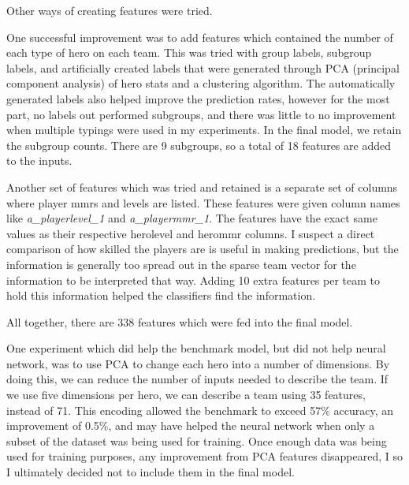 \documentclass[twoside,twocolumn]{article}
\begin{document}
Other ways of creating features were tried.

One successful improvement was to add features which contained the number of each type of hero on each team.  This was tried with group labels, subgroup labels, and artificially created labels that were generated through PCA (principal component analysis) of hero stats and a clustering algorithm.  The automatically generated labels also helped improve the prediction rates, however for the most part, no labels out performed subgroups, and there was little to no improvement when multiple typings were used in my experiments.  In the final model, we retain the subgroup counts.  There are 9 subgroups, so a total of 18 features are added to the inputs.

Another set of features which was tried and retained is a separate set of columns where player mmrs and levels are listed.  These features were given column names like \textit{a\_playerlevel\_1} and \textit{a\_playermmr\_1}.  The features have the exact same values as their respective herolevel and herommr columns. I suspect a direct comparison of how skilled the players are is useful in making predictions, but the information is generally too spread out in the sparse team vector for the information to be interpreted that way.  Adding 10 extra features per team to hold this information helped the classifiers find the information.

All together, there are 338 features which were fed into the final model.

One experiment which did help the benchmark model, but did not help neural network, was to use PCA to change each hero into a number of dimensions.  By doing this, we can reduce the number of inputs needed to describe the team.  If we use five dimensions per hero, we can describe a team using 35 features, instead of 71.  This encoding allowed the benchmark to exceed 57\% accuracy, an improvement of 0.5\%, and may have helped the neural network when only a subset of the dataset was being used for training.  Once enough data was being used for training purposes, any improvement from PCA features disappeared, I so I ultimately decided not to include them in the final model.
\end{document}
